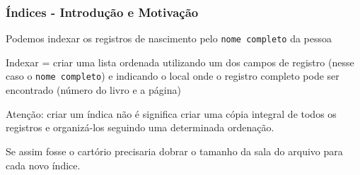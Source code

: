 \documentclass[t, 10pt, aspectratio=169, table, x11names]{beamer}
\begin{document}
	\begin{frame}
		\frametitle{Índices - Introdução e Motivação}
		Podemos indexar os registros de nascimento pelo \texttt{nome completo} da pessoa
		\bigskip
		
		Indexar = criar uma lista ordenada utilizando um dos campos de registro (nesse caso o \texttt{nome completo}) e indicando o local onde o registro completo pode ser encontrado (número do livro e a página)
		\bigskip
		
		Atenção: criar um índica não é significa criar uma cópia integral de todos os registros e organizá-los seguindo uma determinada ordenação.
		\bigskip
		
		Se assim fosse o cartório precisaria dobrar o tamanho da sala do arquivo para cada novo índice. 

	\end{frame}
\end{document}
